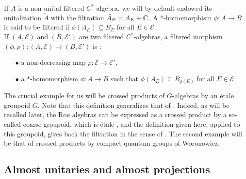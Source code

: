 If $A$ is a non-unital filtered $C^*$-algebra, we will by default endowed its unitalization $\tilde A$ with the filtration $\tilde A_E = A_E + \mathbb C$. A $*$-homomorphism $\phi : A \rightarrow B$ is said to be filtered if $\phi(A_E)\subseteq B_E$ for all $E\in\mathcal E$.\\

If $(A,\mathcal E)$ and $(B,\mathcal E')$ are two filtered $C^*$-algebras, a filtered morphism $(\phi,\rho): (A,\mathcal E)\rightarrow (B,\mathcal E')$ is :
\begin{itemize}
\item[$\bullet$] a non-decreasing map $\rho : \mathcal E\rightarrow \mathcal E'$,
\item[$\bullet$] a $*$-homomorphism $\phi: A\rightarrow B$ such that $\phi (A_E)\subseteq B_{\rho(E)}$ for all $E\in\mathcal E$.
\end{itemize}

The crucial example for us will be crossed products of $G$-algebras by an étale groupoid $G$. Note that this definition generalizes that of \cite{OY2}. Indeed, as will be recalled later, the Roe algebras can be expressed as a crossed product by a so-called coarse groupoid, which is étale \cite{SkTuYu}, and the definition given here, applied to this groupoid, gives back the filtration in the sense of \cite{OY2}. The second example will be that of crossed products by compact quantum groups of Woronowicz.\cite{Wo}

\subsection{Almost unitaries and almost projections}

